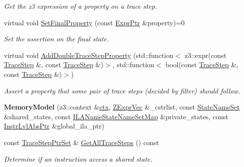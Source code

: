 \begin{DoxyCompactItemize}
\begin{DoxyCompactList}\small\item\em Get the z3 expression of a property on a trace step. \end{DoxyCompactList}\item 
\mbox{\label{classilang_1_1_memory_model_aabac1bb2dfab14a0de7c0808c9b19ec5}} 
virtual void \mbox{\hyperlink{classilang_1_1_memory_model_aabac1bb2dfab14a0de7c0808c9b19ec5}{Set\+Final\+Property}} (const \mbox{\hyperlink{namespaceilang_a7c4196c72e53ea4df4b7861af7bc3bce}{Expr\+Ptr}} \&property)=0
\begin{DoxyCompactList}\small\item\em Set the assertion on the final state. \end{DoxyCompactList}\item 
\mbox{\label{classilang_1_1_memory_model_ae1510a537334776929a28123f7052cec}} 
virtual void \mbox{\hyperlink{classilang_1_1_memory_model_ae1510a537334776929a28123f7052cec}{Add\+Double\+Trace\+Step\+Property}} (std\+::function$<$ z3\+::expr(const \mbox{\hyperlink{classilang_1_1_trace_step}{Trace\+Step}} \&, const \mbox{\hyperlink{classilang_1_1_trace_step}{Trace\+Step}} \&)$>$, std\+::function$<$ bool(const \mbox{\hyperlink{classilang_1_1_trace_step}{Trace\+Step}} \&, const \mbox{\hyperlink{classilang_1_1_trace_step}{Trace\+Step}} \&)$>$)
\begin{DoxyCompactList}\small\item\em Assert a property that some pair of trace steps (decided by filter) should follow. \end{DoxyCompactList}\item 
\mbox{\label{classilang_1_1_memory_model_a7dd5514ac0036887a0279ca83fe0440f}} 
{\bfseries Memory\+Model} (z3\+::context \&\mbox{\hyperlink{classilang_1_1_memory_model_af2ca71c0d173e7cb5502d05a2e4cf24c}{ctx}}, \mbox{\hyperlink{classilang_1_1_memory_model_ab0d3de967acef0330edf4d65d5782ce5}{Z\+Expr\+Vec}} \&\+\_\+cstrlist, const \mbox{\hyperlink{classilang_1_1_memory_model_a0950692c6a72496a2dda46aa985cb337}{State\+Name\+Set}} \&shared\+\_\+states, const \mbox{\hyperlink{classilang_1_1_memory_model_a9e23cd7d325902a4ab1a4f5d8acea67b}{I\+L\+A\+Name\+State\+Name\+Set\+Map}} \&private\+\_\+states, const \mbox{\hyperlink{namespaceilang_ad1b30fdf347e493b3937143da05d1a72}{Instr\+Lvl\+Abs\+Ptr}} \&global\+\_\+ila\+\_\+ptr)
\item 
\mbox{\label{classilang_1_1_memory_model_a62ef25a4418bd52d697778f99faf48a9}} 
const \mbox{\hyperlink{classilang_1_1_memory_model_adf275c2b36d17acd5b6e782c1eca7f92}{Trace\+Step\+Ptr\+Set}} \& \mbox{\hyperlink{classilang_1_1_memory_model_a62ef25a4418bd52d697778f99faf48a9}{Get\+All\+Trace\+Steps}} () const
\begin{DoxyCompactList}\small\item\em Determine if an instruction access a shared state. \end{DoxyCompactList}\end{DoxyCompactItemize}
